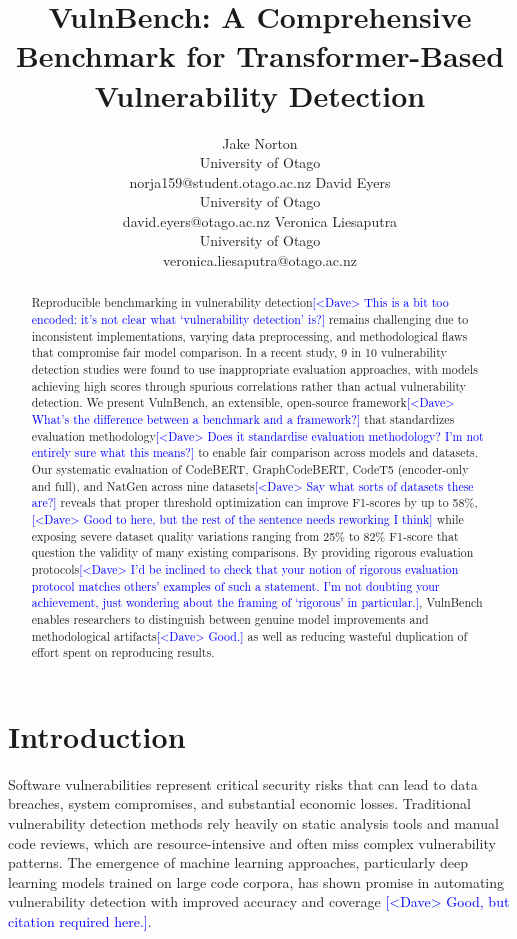 \documentclass[letterpaper]{article}
\title{VulnBench: A Comprehensive Benchmark for Transformer-Based Vulnerability Detection}
\author{
Jake Norton\\
University of Otago\\
norja159@student.otago.ac.nz
\And
David Eyers\\
University of Otago\\
david.eyers@otago.ac.nz
\And
Veronica Liesaputra\\
University of Otago\\
veronica.liesaputra@otago.ac.nz
}
\newcommand{\note}[2][red]{\textcolor{#1}{#2}}
\newcommand{\notedme}[1]{\note[blue]{[<Dave> #1]}}
\begin{document}
\maketitle

\begin{abstract}
	Reproducible benchmarking in vulnerability detection\notedme{This is a bit too encoded: it's not clear what `vulnerability detection' is?} remains challenging due to inconsistent implementations, varying data preprocessing, and methodological flaws that compromise fair model comparison. In a recent study, 9 in 10 vulnerability detection studies were found to use inappropriate evaluation approaches, with models achieving high scores through spurious correlations rather than actual vulnerability detection. We present VulnBench, an extensible, open-source framework\notedme{What's the difference between a benchmark and a framework?} that standardizes evaluation methodology\notedme{Does it standardise evaluation methodology? I'm not entirely sure what this means?} to enable fair comparison across models and datasets. Our systematic evaluation of CodeBERT, GraphCodeBERT, CodeT5 (encoder-only and full), and NatGen across nine datasets\notedme{Say what sorts of datasets these are?} reveals that proper threshold optimization can improve F1-scores by up to 58\%, \notedme{Good to here, but the rest of the sentence needs reworking I think} while exposing severe dataset quality variations ranging from 25\% to 82\% F1-score that question the validity of many existing comparisons. By providing rigorous evaluation protocols\notedme{I'd be inclined to check that your notion of rigorous evaluation protocol matches others' examples of such a statement. I'm not doubting your achievement, just wondering about the framing of `rigorous' in particular.}, VulnBench enables researchers to distinguish between genuine model improvements and methodological artifacts\notedme{Good.} as well as reducing wasteful duplication of effort spent on reproducing results.
\end{abstract}


\section{Introduction}

Software vulnerabilities represent critical security risks that can lead to data breaches, system compromises, and substantial economic losses. Traditional vulnerability detection methods rely heavily on static analysis tools and manual code reviews, which are resource-intensive and often miss complex vulnerability patterns. The emergence of machine learning approaches, particularly deep learning models trained on large code corpora, has shown promise in automating vulnerability detection with improved accuracy and coverage \notedme{Good, but citation required here.}.
\end{document}
